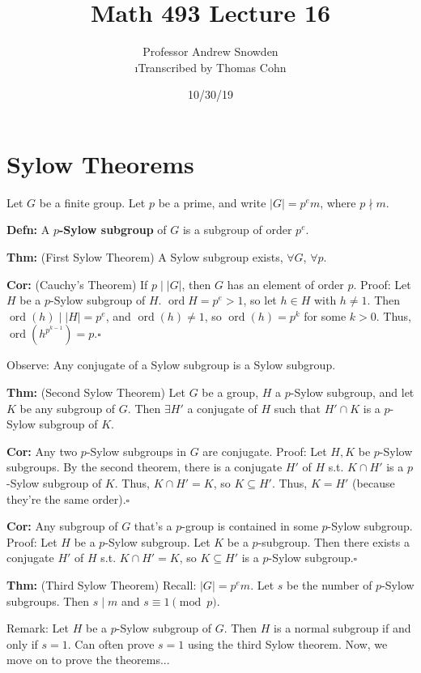 \documentclass[10pt,letterpaper]{article}
\author{Professor Andrew Snowden\\ \small\i{Transcribed by Thomas Cohn}}
\title{Math 493 Lecture 16}
\date{10/30/19} %
\newcommand{\n}{\hfill\break}
\newcommand{\hangblock}[2]{\par\noindent\settowidth{\hangindent}{\textbf{#1: }}\textbf{#1: }\!\!\!#2}
\newcommand{\defn}[1]{\hangblock{Defn}{#1}}
\newcommand{\thm}[1]{\hangblock{Thm}{#1}}
\newcommand{\cor}[1]{\hangblock{Cor}{#1}}
\newcommand{\proven}{\;$\square$\n}
\newcommand{\card}[1]{\left|#1\right|}
\newcommand{\ndiv}{\nmid}
\DeclareMathOperator{\ord}{ord}
\newcommand{\st}{s.t.}
\begin{document}
\maketitle
\setlength\RaggedRightParindent{\parindent}
\RaggedRight

\section*{Sylow Theorems}

\par\noindent
Let $G$ be a finite group. Let $p$ be a prime, and write $\card{G}=p^{e}m$, where $p\ndiv{}m$.\n

\defn{
	A \textbf{$p$-Sylow subgroup} of $G$ is a subgroup of order $p^{e}$.\n
}

\thm{
	(First Sylow Theorem) A Sylow subgroup exists, $\forall{}G$, $\forall{}p$.\n
}

\cor{
	(Cauchy's Theorem) If $p\mid\card{G}$, then $G$ has an element of order $p$.\n
	Proof: Let $H$ be a $p$-Sylow subgroup of $H$. $\ord{H}=p^{e}>1$, so let $h\in{}H$ with $h\ne{}1$. Then $\ord(h)\mid\card{H}=p^{e}$, and $\ord(h)\ne{}1$, so $\ord(h)=p^{k}$ for some $k>0$. Thus, $\ord(h^{p^{k-1}})=p$.\proven
}

\par\noindent
Observe: Any conjugate of a Sylow subgroup is a Sylow subgroup.\n

\thm{
	(Second Sylow Theorem) Let $G$ be a group, $H$ a $p$-Sylow subgroup, and let $K$ be any subgroup of $G$. Then $\exists{}H'$ a conjugate of $H$ such that $H'\cap{}K$ is a $p$-Sylow subgroup of $K$.\n
}

\cor{
	Any two $p$-Sylow subgroups in $G$ are conjugate.\n
	Proof: Let $H,K$ be $p$-Sylow subgroups. By the second theorem, there is a conjugate $H'$ of $H$ \st{} $K\cap{}H'$ is a $p$-Sylow subgroup of $K$. Thus, $K\cap{}H'=K$, so $K\subseteq{}H'$. Thus, $K=H'$ (because they're the same order).\proven
}

\cor{
	Any subgroup of $G$ that's a $p$-group is contained in some $p$-Sylow subgroup.\n
	Proof: Let $H$ be a $p$-Sylow subgroup. Let $K$ be a $p$-subgroup. Then there exists a conjugate $H'$ of $H$ \st{} $K\cap{}H'=K$, so $K\subseteq{}H'$ is a $p$-Sylow subgroup.\proven
}

\thm{
	(Third Sylow Theorem) Recall: $\card{G}=p^{e}m$. Let $s$ be the number of $p$-Sylow subgroups. Then $s\mid{}m$ and $s\equiv{}1\pmod{p}$.\n
}

\par\noindent
Remark: Let $H$ be a $p$-Sylow subgroup of $G$. Then $H$ is a normal subgroup if and only if $s=1$. Can often prove $s=1$ using the third Sylow theorem.\n
Now, we move on to prove the theorems...\n
\end{document}
